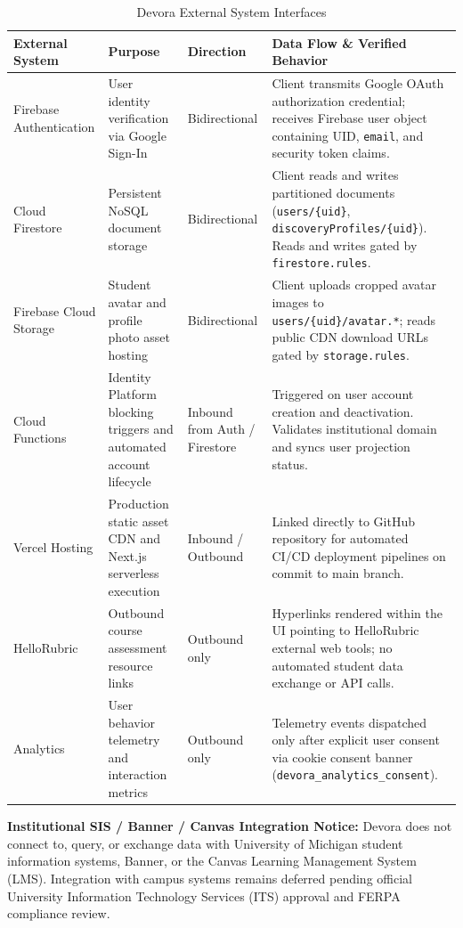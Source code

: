 \documentclass[11pt,letterpaper]{article}
\begin{document}
\begin{table}[h!]
\centering
\small
\begin{tabularx}{\textwidth}{L{3.2cm} L{3.2cm} L{2.2cm} Y}
\toprule
\textbf{External System} & \textbf{Purpose} & \textbf{Direction} & \textbf{Data Flow \& Verified Behavior} \\
\midrule
Firebase Authentication & User identity verification via Google Sign-In & Bidirectional & Client transmits Google OAuth authorization credential; receives Firebase user object containing UID, \texttt{email}, and security token claims. \\
\addlinespace
Cloud Firestore & Persistent NoSQL document storage & Bidirectional & Client reads and writes partitioned documents (\texttt{users/\{uid\}}, \texttt{discoveryProfiles/\{uid\}}). Reads and writes gated by \texttt{firestore.rules}. \\
\addlinespace
Firebase Cloud Storage & Student avatar and profile photo asset hosting & Bidirectional & Client uploads cropped avatar images to \texttt{users/\{uid\}/avatar.*}; reads public CDN download URLs gated by \texttt{storage.rules}. \\
\addlinespace
Cloud Functions & Identity Platform blocking triggers and automated account lifecycle & Inbound from Auth / Firestore & Triggered on user account creation and deactivation. Validates institutional domain and syncs user projection status. \\
\addlinespace
Vercel Hosting & Production static asset CDN and Next.js serverless execution & Inbound / Outbound & Linked directly to GitHub repository for automated CI/CD deployment pipelines on commit to main branch. \\
\addlinespace
HelloRubric & Outbound course assessment resource links & Outbound only & Hyperlinks rendered within the UI pointing to HelloRubric external web tools; no automated student data exchange or API calls. \\
\addlinespace
Analytics & User behavior telemetry and interaction metrics & Outbound only & Telemetry events dispatched only after explicit user consent via cookie consent banner (\texttt{devora\_analytics\_consent}). \\
\bottomrule
\end{tabularx}
\caption{Devora External System Interfaces}
\label{tab:software-interfaces}
\end{table}

\noindent\textbf{Institutional SIS / Banner / Canvas Integration Notice:} Devora does not connect to, query, or exchange data with University of Michigan student information systems, Banner, or the Canvas Learning Management System (LMS). Integration with campus systems remains deferred pending official University Information Technology Services (ITS) approval and FERPA compliance review.
\end{document}
